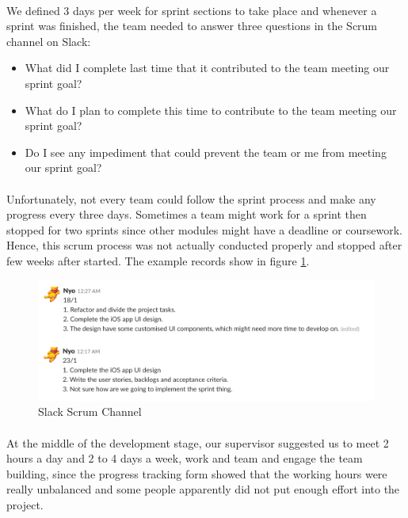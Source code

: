\documentclass[12pt,a4paper]{article}
\begin{document}
          \paragraph{}We defined 3 days per week for sprint sections to take place and whenever a sprint was finished, the team needed to answer three questions in the Scrum channel on Slack:
          
          \begin{itemize}
            \item What did I complete last time that it contributed to the team meeting our sprint goal?
            \item What do I plan to complete this time to contribute to the team meeting our sprint goal?
            \item Do I see any impediment that could prevent the team or me from meeting our sprint goal?
          \end{itemize}    

          \paragraph{}Unfortunately, not every team could follow the sprint process and make any progress every three days. Sometimes a team might work for a sprint then stopped for two sprints since other modules might have a deadline or coursework. Hence, this scrum process was not actually conducted properly and stopped after few weeks after started. The example records show in figure \ref{fig:Slack Scrum Channel}. 

          \begin{figure}[H]
            \centering
            \includegraphics[width=1\textwidth]{../assets/development-records-slack-scrum-channel.png}
            \caption{Slack Scrum Channel}
            \label{fig:Slack Scrum Channel}
          \end{figure}
          
          \paragraph{}At the middle of the development stage, our supervisor suggested us to meet 2 hours a day and 2 to 4 days a week, work and team and engage the team building, since the progress tracking form showed that the working hours were really unbalanced and some people apparently did not put enough effort into the project. 
          
\end{document}
